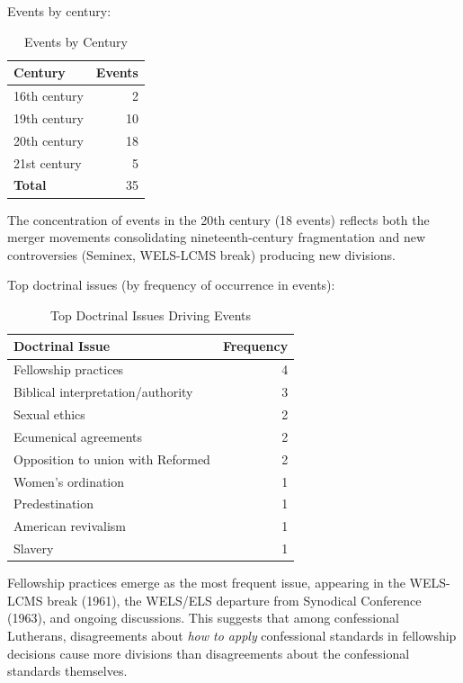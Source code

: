 Events by century:

\begin{table}[h]
\centering
\begin{tabular}{lr}
\hline
\textbf{Century} & \textbf{Events} \\
\hline
16th century & 2 \\
19th century & 10 \\
20th century & 18 \\
21st century & 5 \\
\hline
\textbf{Total} & 35 \\
\hline
\end{tabular}
\caption{Events by Century}
\label{tab:events_century}
\end{table}

The concentration of events in the 20th century (18 events) reflects both the merger movements consolidating nineteenth-century fragmentation and new controversies (Seminex, WELS-LCMS break) producing new divisions.

Top doctrinal issues (by frequency of occurrence in events):

\begin{table}[h]
\centering
\begin{tabular}{lr}
\hline
\textbf{Doctrinal Issue} & \textbf{Frequency} \\
\hline
Fellowship practices & 4 \\
Biblical interpretation/authority & 3 \\
Sexual ethics & 2 \\
Ecumenical agreements & 2 \\
Opposition to union with Reformed & 2 \\
Women's ordination & 1 \\
Predestination & 1 \\
American revivalism & 1 \\
Slavery & 1 \\
\hline
\end{tabular}
\caption{Top Doctrinal Issues Driving Events}
\label{tab:doctrinal_issues}
\end{table}

Fellowship practices emerge as the most frequent issue, appearing in the WELS-LCMS break (1961), the WELS/ELS departure from Synodical Conference (1963), and ongoing discussions. This suggests that among confessional Lutherans, disagreements about \textit{how to apply} confessional standards in fellowship decisions cause more divisions than disagreements about the confessional standards themselves.


